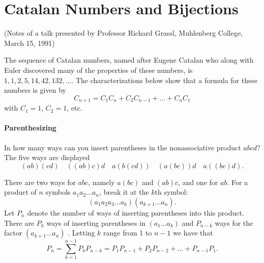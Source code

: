 \documentclass[10pt,]{book}
\theoremstyle{plain}
\theoremstyle{definition}
\theoremstyle{definition}
\theoremstyle{definition}
\theoremstyle{definition}
\numberwithin{equation}{chapter}
\begin{document}
\section[{Catalan Numbers and Bijections}]{Catalan Numbers and Bijections}\label{sec_basic-catalan}
\hypertarget{p-893}{}%
(Notes of a talk presented by Professor Richard Grassl, Muhlenberg College, March 15, 1991)%
\par
\hypertarget{p-894}{}%
The sequence of Catalan numbers, named after Eugene Catalan who along with Euler discovered many of the properties of these numbers, is \(1, 1, 2, 5, 14, 42, 132, \ldots\). The characterizations below show that a formula for these numbers is given by%
\begin{equation*}
C_{n + 1} = C_{1}C_{n} + C_{2}C_{n - 1} + \ldots + C_{n}C_{1}
\end{equation*}
with \(C_1 = 1\), \(C_2 = 1\), etc.%
\typeout{************************************************}
\typeout{************************************************}
\paragraph[{Parenthesizing}]{Parenthesizing}\hypertarget{paragraphs-7}{}
\hypertarget{p-895}{}%
In how many ways can you insert parentheses in the nonassociative product \(abcd\)? The five ways are displayed%
\begin{equation*}
(ab)(cd)\quad ((ab)c)d \quad a(b(cd)) \quad (a(bc))d \quad a((bc)d).
\end{equation*}
%
\par
\hypertarget{p-896}{}%
There are two ways for \(abc\), namely \(a(bc)\) and \((ab)c\), and one for \(ab\). For a product of \(n\) symbols \(a_{1}a_{2}\ldots a_{n}\), break it at the \(k\)th symbol:%
\begin{equation*}
(a_{1}a_{2}a_{3}\ldots a_{k})(a_{k + 1}\ldots a_{n}).
\end{equation*}
Let \(P_{n}\) denote the number of ways of inserting parentheses into this product. There are \(P_k\) ways of inserting parentheses in \(\left(a_{1}\ldots a_{k} \right)\) and \(P_{n - k}\) ways for the factor \((a_{k + 1}\ldots a_{n})\) . Letting \(k\) range from 1 to \(n - 1\) we have that%
\begin{equation*}
P_{n} = \sum_{k = 1}^{n - 1} P_{k}P_{n - k} = P_{1}P_{n - 1} + P_{2}P_{n - 2} + \ldots + P_{n - 1}P_{1}.
\end{equation*}
%
\typeout{************************************************}
\typeout{************************************************}
\end{document}
